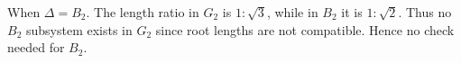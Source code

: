 \documentclass[11pt, reqno]{amsart}
\theoremstyle{definition}
\numberwithin{equation}{section}
\begin{document}
 When $\Delta = B_2$. The length ratio in $G_2$ is $1:\sqrt{3}$, while in $B_2$ it is $1:\sqrt{2}$. Thus no $B_2$ subsystem exists in $G_2$ since root lengths are not compatible. Hence no check needed for $B_2$.
 
\end{document}
